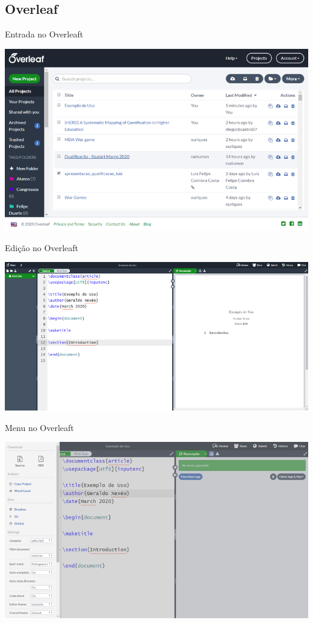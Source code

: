 \documentclass{beamer}
\begin{document}
\subsection{Overleaf}
\begin{frame}{Entrada no Overleaft}
\begin{center}
    \includegraphics[width=\linewidth]{Images/Picture2.png}
\end{center}    
\end{frame}

\begin{frame}{Edição no Overleaft}
\begin{center}
    \includegraphics[width=0.8\linewidth]{Images/Picture3.png}
\end{center}    
\end{frame}

\begin{frame}{Menu no Overleaft}
\begin{center}
    \centering
    \includegraphics[width=\linewidth]{Images/Picture4.png}
\end{center}    
\end{frame}
\end{document}
